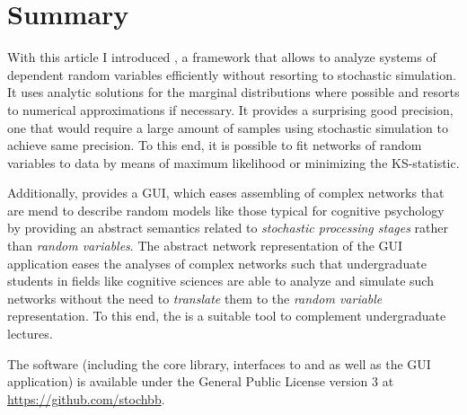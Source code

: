 \section{Summary}
With this article I introduced , a framework that allows to analyze systems of dependent random variables efficiently without resorting to stochastic simulation. It uses analytic solutions for the marginal distributions where possible and resorts to numerical approximations if necessary. It provides a surprising good precision, one that would require a large amount of samples using stochastic simulation to achieve same precision.
To this end, it is possible to fit networks of random variables to data by means of maximum likelihood or minimizing the KS-statistic.

Additionally,  provides a GUI, which eases assembling of complex networks that are mend to describe random models like those typical for cognitive psychology by providing an abstract semantics related to \emph{stochastic processing stages} rather than \emph{random variables}. The abstract network representation of the GUI application eases the analyses of complex networks such that undergraduate students in fields like cognitive sciences are able to analyze and simulate such networks without the need to \emph{translate} them to the \emph{random variable} representation. To this end, the  is a suitable tool to complement undergraduate lectures.

The software (including the core library, interfaces to  and  as well as the GUI application) is available under the General Public License version 3 at \href{https://github.com/stochbb}{https://github.com/stochbb}.
